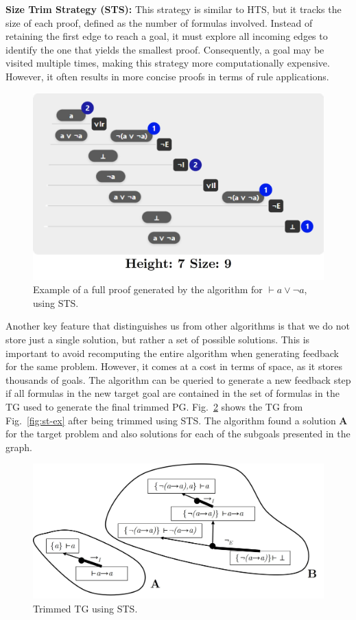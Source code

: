 \textbf{Size Trim Strategy (STS):} This strategy is similar to HTS, but it tracks the size of each proof, defined as the number of formulas involved. Instead of retaining the first edge to reach a goal, it must explore all incoming edges to identify the one that yields the smallest proof. Consequently, a goal may be visited multiple times, making this strategy more computationally expensive. However, it often results in more concise proofs in terms of rule applications.

\begin{figure}
    \centering
    \includegraphics[width=0.6\linewidth]{resources/trim-size.jpg}
    \caption{Example of a full proof generated by the algorithm for \(\vdash a \vee \lnot a\), using STS.}
    \label{fig:sg-trim-size}
\end{figure}

Another key feature that distinguishes us from other algorithms is that we do not store just a single solution, but rather a set of possible solutions. This is important to avoid recomputing the entire algorithm when generating feedback for the same problem. However, it comes at a cost in terms of space, as it stores thousands of goals. The algorithm can be queried to generate a new feedback step if all formulas in the new target goal are contained in the set of formulas in the TG used to generate the final trimmed PG. Fig.~\ref{fig:sg-trim} shows the TG from Fig.~\ref{fig:st-ex} after being trimmed using STS. The algorithm found a solution \textbf{A} for the target problem and also solutions for each of the subgoals presented in the graph.

\begin{figure}
    \centering
    \includegraphics[width=0.8\linewidth]{resources/sg-final.jpg}
    \caption{Trimmed TG using STS.}
    \label{fig:sg-trim}
\end{figure}

